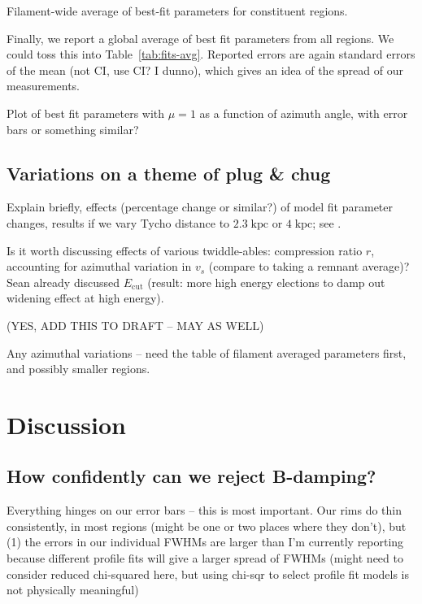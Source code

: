 \documentclass[iop, apj, numberedappendix, twocolappendix]{emulateapj}
\newcommand*{\mt}{\mathrm}
\newcommand*{\unit}[1]{\;\mt{#1}}  %
\begin{document}
\begin{table*}
    \scriptsize
    \centering
    \caption{Filament-wide average of best-fit parameters for constituent regions.
    \label{tab:fits-avg}}
    
\end{table*}

Finally, we report a global average of best fit parameters from all regions.
We could toss this into Table~\ref{tab:fits-avg}.  Reported errors are
again standard errors of the mean (not CI, use CI? I dunno), which gives an
idea of the spread of our measurements.

Plot of best fit parameters with $\mu=1$ as a function of azimuth angle, with
error bars or something similar?

\subsection{Variations on a theme of plug \& chug}

Explain briefly, effects (percentage change or similar?) of model fit parameter
changes, results if we vary Tycho distance to $2.3 \unit{kpc}$ or $4
\unit{kpc}$; see \citet{hayato2010}.

Is it worth discussing effects of various twiddle-ables: compression ratio $r$,
accounting for azimuthal variation in $v_s$ (compare to taking a remnant
average)?  Sean already discussed $E_{\mt{cut}}$ (result: more high energy
elections to damp out widening effect at high energy).

(YES, ADD THIS TO DRAFT -- MAY AS WELL)

Any azimuthal variations -- need the table of filament averaged parameters
first, and possibly smaller regions.

\section{Discussion}

\subsection{How confidently can we reject B-damping?}

Everything hinges on our error bars -- this is most important.  Our rims do
thin consistently, in most regions (might be one or two places where they
don't), but (1) the errors in our individual FWHMs are larger than I'm
currently reporting because different profile fits will give a larger spread of
FWHMs (might need to consider reduced chi-squared here, but using chi-sqr to
select profile fit models is not physically meaningful)
\end{document}
